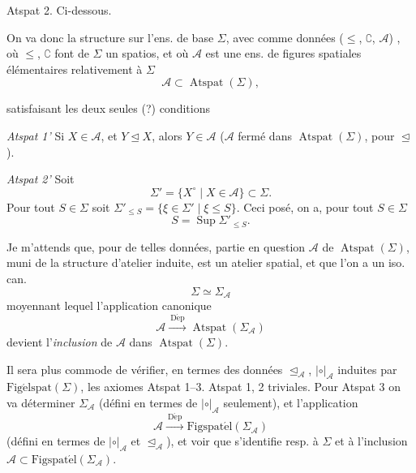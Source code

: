 \documentclass[11pt,a4paper]{article}
\begin{document}
Atspat 2. Ci-dessous.


 On va donc  la structure sur l'ens. de base $\Sigma$, avec comme données
($\leq$, \struck{\ill{}} $\complement$, $\mathcal{A}$) \struck{\ill{}},
où $\leq$, $\complement$ font de $\Sigma$ un spatios, et où $\mathcal{A}$ est
une  ens. de figures spatiales élémentaires relativement à $\Sigma$
\[
  \mathcal{A} \subset \operatorname{Atspat}(\Sigma) ,
\]


satisfaisant les deux seules (?) conditions

\emph{Atspat 1'} \quad Si $X \in \mathcal{A}$, et
$Y \trianglelefteq X$, alors $Y \in \mathcal{A}$ ($\mathcal{A}$ fermé dans
$\operatorname{Atspat}(\Sigma)$, pour $\trianglelefteq$).

   

\emph{Atspat 2'} \quad \struck{$\forall$} Soit
\[
  \Sigma' = \{ X^{\circ} \mid X \in \mathcal{A} \} \subset \Sigma .
\]
Pour tout $S \in \Sigma$ soit
$\Sigma'_{\leq S} = \{ \xi \in \Sigma' \mid \xi \leq S \}$. Ceci posé, on a,
pour tout $S \in \Sigma$
\[
  S = \operatorname{Sup} \Sigma'_{\leq S} .
\]

Je m'attends que, pour de telles données, 
partie en question $\mathcal{A}$ de $\operatorname{Atspat}(\Sigma)$, muni de la structure
d'atelier induite, est un atelier spatial, et que l'on a un iso. can.
\[
  \Sigma \simeq \Sigma_{\mathcal{A}}
\]
moyennant lequel l'application canonique
\[
  \mathcal{A} \xrightarrow{\ \operatorname{D\acute{e}p}\ }
  \operatorname{Atspat}(\Sigma_{\mathcal{A}})
\]
devient l'\emph{inclusion} de $\mathcal{A}$ dans
$\operatorname{Atspat}(\Sigma)$.



Il sera plus commode de vérifier,  en termes des données
$\trianglelefteq_{\mathcal{A}}$, $\mathrel{|\circ|}_{\mathcal{A}}$ induites par
$\operatorname{Fig\acute{e}lspat}(\Sigma)$, les axiomes Atspat 1--3.
Atspat 1, 2 triviales. Pour Atspat 3 on va déterminer  $\Sigma_{\mathcal{A}}$ (défini en termes de
$\mathrel{|\circ|}_{\mathcal{A}}$ seulement), et l'application
\[
  \mathcal{A} \xrightarrow{\ \operatorname{D\acute{e}p}\ }
  \operatorname{Figspat\acute{e}l}(\Sigma_{\mathcal{A}})
\]
(défini en termes de $\mathrel{|\circ|}_{\mathcal{A}}$ et
$\trianglelefteq_{\mathcal{A}}$), et voir que  s'identifie resp. à $\Sigma$ et à l'inclusion  $\mathcal{A} \subset \operatorname{Figspat\acute{e}l}(\Sigma_{\mathcal{A}})$.
\end{document}

